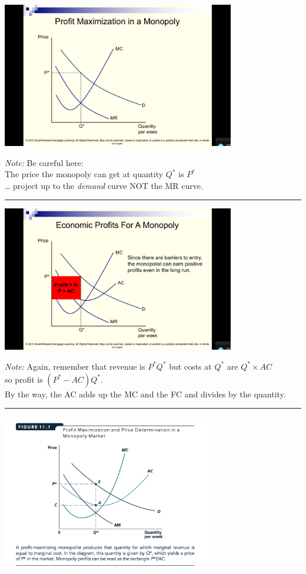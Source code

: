 \documentclass[]{article}
\begin{document}
\includegraphics[height=2.5in]{picsfigs/monopprofit3.png}

\emph{Note:} Be careful here:\\
The price the monopoly can get at quantity \(Q^*\) is \(P^*\)\\
\ldots{} project up to the \emph{demand} curve NOT the MR curve.

\begin{center}\rule{0.5\linewidth}{\linethickness}\end{center}

\includegraphics[height=2.5in]{picsfigs/monopprofit4.png}

\emph{Note:} Again, remember that revenue is \(P^*Q^*\) but costs at
\(Q^*\) are \(Q^* \times AC\)\\
so profit is \((P^*-AC)Q^*\).\\
By the way, the AC adds up the MC and the FC and divides by the
quantity.

\begin{center}\rule{0.5\linewidth}{\linethickness}\end{center}

\includegraphics[height=2.7in]{picsfigs/monopprofitmax.png}
\end{document}
